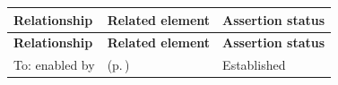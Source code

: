 \begingroup\small\setlength{\TableWidth}{\dimexpr\linewidth-6\tabcolsep-4\arrayrulewidth\relax}
\begin{longtable}{|>{\raggedright\arraybackslash}p{0.27\TableWidth}|>{\raggedright\arraybackslash}p{0.48\TableWidth}|>{\raggedright\arraybackslash}p{0.25\TableWidth}|}
\hline\rowcolor{TableHead}\textbf{Relationship} & \textbf{Related element} & \textbf{Assertion status}\\\hline\endfirsthead
\hline\rowcolor{TableHead}\textbf{Relationship} & \textbf{Related element} & \textbf{Assertion status}\\\hline\endhead
\hline\endfoot
To: enabled by & \nameref{cap:bec-health-information-access} (p.\,\pageref{cap:bec-health-information-access}) & Established\\\hline
\end{longtable}\endgroup


